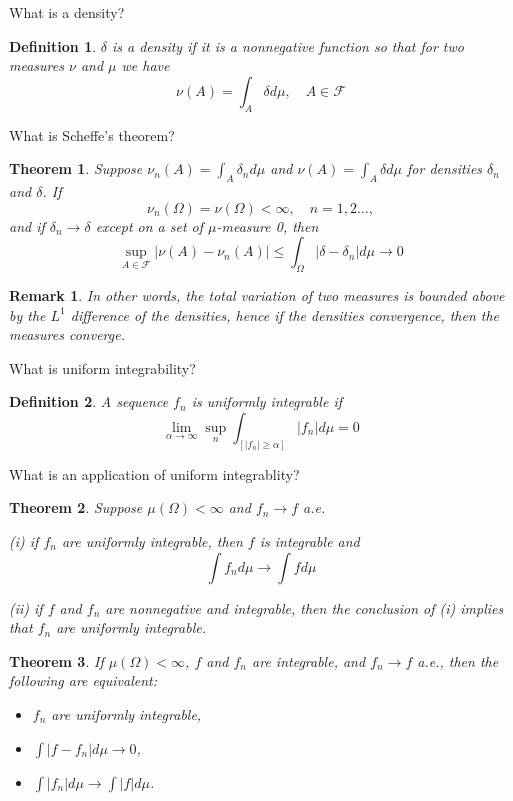 \documentclass[avery5388,grid,frame]{flashcards}
\newcommand{\F}{\mathcal F}
\newtheorem*{theorem}{Theorem}
\newtheorem*{definition}{Definition}
\newtheorem*{remark}{Remark}
\begin{document}
\begin{flashcard}
    {What is a density?}
    \begin{definition}
        $\delta$ is a density if it is a nonnegative function so that for two measures $\nu$ and $\mu$ we have
        $$\nu(A) = \int_A \delta d\mu, \quad A \in \F$$
    \end{definition}
\end{flashcard}


\begin{flashcard}
    {What is Scheffe's theorem?}
    \begin{theorem}
        Suppose $\nu_n(A) = \int_A \delta_n d\mu$ and $\nu(A) = \int_A \delta d\mu$ for densities $\delta_n$ and $\delta$. If
        $$\nu_n(\Omega) = \nu(\Omega)< \infty, \quad n = 1,2\dots,$$
        and if $\delta_n \rightarrow \delta$ except on a set of $\mu$-measure 0, then
        $$\sup_{A \in \F} | \nu(A) - \nu_n(A) | \leq \int_\Omega |\delta - \delta_n| d\mu \rightarrow 0$$
    \end{theorem}

    \begin{remark}
        In other words, the total variation of two measures is bounded above by the $L^1$ difference of the densities, hence if the densities convergence, then the measures converge.
    \end{remark}
\end{flashcard}


\begin{flashcard}
    {What is uniform integrability?}
    \begin{definition}
        A sequence $f_n$ is uniformly integrable if
        $$\lim_{\alpha \rightarrow \infty} \sup_n \int_{[|f_n| \geq \alpha]} |f_n| d\mu = 0$$
    \end{definition}
\end{flashcard}


\begin{flashcard}
    {What is an application of uniform integrablity?}
    \begin{theorem}
        Suppose $\mu(\Omega) < \infty$ and $f_n \rightarrow f$ a.e.

        (i) if $f_n$ are uniformly integrable, then $f$ is integrable and
        $$\int f_n d\mu \rightarrow \int f d\mu$$

        (ii) if $f$ and $f_n$ are nonnegative and integrable, then the conclusion of (i) implies that $f_n$ are uniformly integrable.
    \end{theorem}
    \begin{theorem}
        If $\mu(\Omega) < \infty$, $f$ and $f_n$ are integrable, and $f_n \rightarrow f$ a.e., then the following are equivalent:
        \begin{itemize}
            \item $f_n$ are uniformly integrable,
            \item $\int | f - f_n | d\mu \rightarrow 0$,
            \item $\int |f_n| d\mu \rightarrow \int |f| d\mu$.
        \end{itemize}
    \end{theorem}
\end{flashcard}
\end{document}

